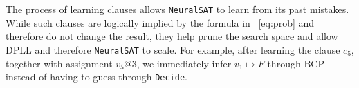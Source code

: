 \documentclass[oneside,11pt,dvipsnames]{book}
\numberwithin{equation}{section}
\theoremstyle{definition}
\theoremstyle{remark}
\newcommand{\tool}{\texttt{NeuralSAT}}
\begin{document}
The process of learning clauses allows \tool{} to learn from its past mistakes.
While such clauses are logically implied by the formula in ~\autoref{eq:prob} and therefore do not change the result, they help prune the search space and allow DPLL and therefore \tool{} to scale. For example, after learning the clause $c_5$, together with assignment $v_5@3$, we immediately infer $v_1 \mapsto F$ through BCP instead of having to guess through \texttt{Decide}.







\end{document}
